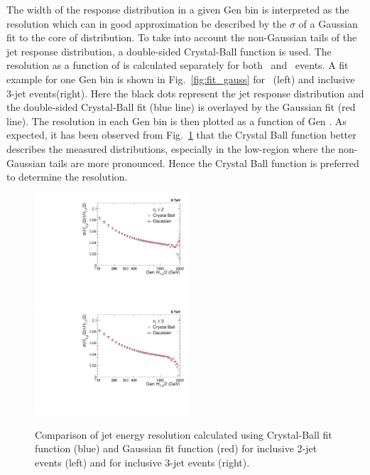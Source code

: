 The width of the response distribution in a given Gen \httwo bin is interpreted as the resolution which can in good approximation be described by the $\sigma$ of a Gaussian fit to the core of distribution. To take into account the non-Gaussian tails of the jet response distribution, a double-sided Crystal-Ball function is used. The resolution as a function of \httwo is calculated separately for both \njt~and \njth~events. A fit example for one Gen \httwo bin is shown in Fig.~\ref{fig:fit_gauss} for \njt~(left) and inclusive 3-jet events(right). Here the black dots represent the jet response distribution and the double-sided Crystal-Ball fit (blue line) is overlayed by the Gaussian fit (red line). The resolution in each Gen \httwo bin is then plotted as a function of Gen \httwo. As expected, it has been observed from Fig.~\ref{fig:res_comp} that the Crystal Ball function better describes the measured distributions, especially in the low-\httwo region where the non-Gaussian tails are more pronounced. Hence the Crystal Ball function is preferred to determine the resolution.

\begin{figure}[h]
 \begin{center}
 \includegraphics[width=0.51\textwidth]{Plots_HT_2_150/Comparison_Resolution_Crystal_Gauss_2.pdf}%
 ~~\includegraphics[width=0.51\textwidth]{Plots_HT_2_150/Comparison_Resolution_Crystal_Gauss_3.pdf}
 \caption{Comparison of jet energy resolution calculated using Crystal-Ball fit function (blue) and Gaussian fit function (red) for inclusive 2-jet events (left) and for inclusive 3-jet events (right).}
 \label{fig:res_comp}
  \end{center}
\end{figure}

